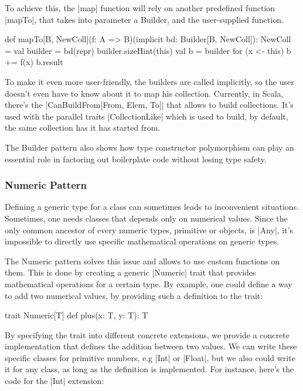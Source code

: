 To achieve this, the |map| function will rely on another predefined function |mapTo|, that takes into parameter a Builder, and the user-supplied function.

\begin{lstlisting-nobreak}
 def mapTo[B, NewColl](f: A => B)(implicit bd: Builder[B, NewColl]): NewColl = {
   val builder = bd(repr)
   builder.sizeHint(this)
   val b = builder
   for (x <- this) b += f(x)
   b.result
 }
\end{lstlisting-nobreak}

To make it even more user-friendly, the builders are called implicitly, so the user doesn't even have to know about it to map his collection. Currently, in Scala, there's the |CanBuildFrom[From, Elem, To]| that allows to build collections. It's used with the parallel traits |CollectionLike| which is used to build, by default, the same collection has it has started from.

The Builder pattern also shows how type constructor polymorphism can play an essential role in factoring out boilerplate code without losing type safety.\cite{adriaan}

\subsubsection{Numeric Pattern}

Defining a generic type for a class can sometimes leads to inconvenient situations. Sometimes, one needs classes that depends only on numerical values. Since the only common ancestor of every numeric types, primitive or objects, is |Any|, it's impossible to directly use specific mathematical operations on generic types.

The Numeric pattern solves this issue and allows to use custom functions on them. This is done by creating a generic |Numeric| trait that provides mathematical operations for a certain type. By example, one could define a way to add two numerical values, by providing such a definition to the trait:

\begin{lstlisting-nobreak}
 trait Numeric[T] {
   def plus(x: T, y: T): T
 }
\end{lstlisting-nobreak}

By specifying the trait into different concrete extensions, we provide a concrete implementation that defines the addition between two values. We can write these specific classes for primitive numbers, e.g |Int| or |Float|, but we also could write it for any class, as long as the definition is implemented. For instance, here's the code for the |Int| extension:

